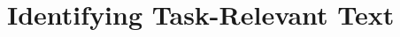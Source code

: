 \setcounter{chapter}{4}
\setcounter{rq}{1}


\chapter{Identifying Task-Relevant Text}
\label{ch:identifying}














% 
% 
% 
% 


